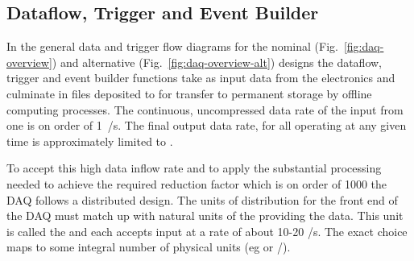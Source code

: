 
\subsection{Dataflow, Trigger and Event Builder}
\label{sec:fd-daq-hlt}


In the general data and trigger flow diagrams for the nominal
(Fig.~\ref{fig:daq-overview}) and alternative
(Fig.~\ref{fig:daq-overview-alt}) designs the dataflow, trigger and
event builder functions take as input data from the 
electronics and culminate in files deposited to  for
transfer to permanent storage by offline computing processes.  
The continuous, uncompressed data rate of the input from one
 is on order of \SI{1}{\TB/\s}. 
The final output data rate, for all  operating at
any given time is approximately limited to \offsitegbyteps. 

To accept this high data inflow rate and to apply the substantial
processing needed to achieve the required reduction factor which is on
order of \num{1000} the DAQ follows a distributed design.
The units of distribution for the front end of the DAQ must match up
with natural units of the  providing the data. 
This unit is called the  and each accepts input at a
rate of about 10-20 \si{\GB/\s}. 
The exact choice maps to some integral number of physical
 units (eg   or 
/).

